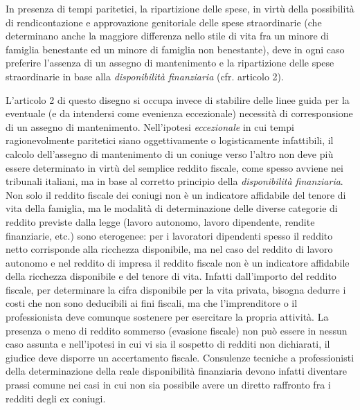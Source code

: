 \documentclass[twocolumn,12pt]{article}
\begin{document}
In presenza di tempi paritetici, la ripartizione delle spese, in virtù della possibilità di rendicontazione e approvazione genitoriale delle spese straordinarie (che determinano anche la maggiore differenza nello stile di vita fra un minore di famiglia benestante ed un minore di famiglia non benestante), deve in ogni caso preferire l'assenza di un assegno di mantenimento e la ripartizione delle spese straordinarie in base alla \emph{disponibilità finanziaria} (cfr. articolo 2).

\bigbreak

L'articolo 2 di questo disegno si occupa invece di stabilire delle linee guida per la eventuale (e da intendersi come evenienza eccezionale) necessità di corresponsione di un assegno di mantenimento.
\smallbreak
Nell'ipotesi \emph{eccezionale} in cui tempi ragionevolmente paritetici siano oggettivamente o logisticamente infattibili, il calcolo dell'assegno di mantenimento di un coniuge verso l'altro non deve più essere determinato in virtù del semplice reddito fiscale, come spesso avviene nei tribunali italiani, ma in base al corretto principio della \emph{disponibilità finanziaria}. Non solo il reddito fiscale dei coniugi non è un indicatore affidabile del tenore di vita della famiglia, ma le modalità di determinazione delle diverse categorie di reddito previste dalla legge (lavoro autonomo, lavoro dipendente, rendite finanziarie, etc.) sono eterogenee: per i lavoratori dipendenti spesso il reddito netto corrisponde alla ricchezza disponibile, ma nel caso del reddito di lavoro autonomo e nel reddito di impresa il reddito fiscale non è un indicatore affidabile della ricchezza disponibile e del tenore di vita. Infatti dall'importo del reddito fiscale, per determinare la cifra disponibile per la vita privata, bisogna dedurre i costi che non sono deducibili ai fini fiscali, ma che l'imprenditore o il professionista deve comunque sostenere per esercitare la propria attività. La presenza o meno di reddito sommerso (evasione fiscale) non può essere in nessun caso assunta e nell'ipotesi in cui vi sia il sospetto di redditi non dichiarati, il giudice deve disporre un accertamento fiscale. Consulenze tecniche a professionisti della determinazione della reale disponibilità finanziaria devono infatti diventare prassi comune nei casi in cui non sia possibile avere un diretto raffronto fra i redditi degli ex coniugi.
\smallbreak
\end{document}
